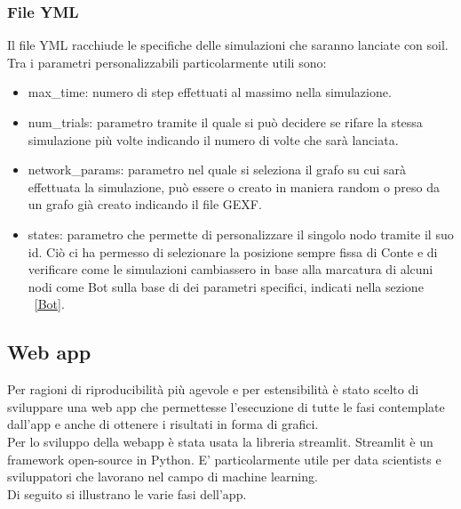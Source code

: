         \subsubsection{File YML}
        Il file YML racchiude le specifiche delle simulazioni che saranno lanciate con soil.\\
        Tra i parametri personalizzabili particolarmente utili sono:
        \begin{itemize}
          \item max\_time: numero di step effettuati al massimo nella simulazione.
          \item num\_trials: parametro tramite il quale si può decidere se rifare la stessa simulazione più volte indicando il numero di volte che sarà lanciata.
          \item network\_params: parametro nel quale si seleziona il grafo su cui sarà effettuata la simulazione, può essere o creato in maniera random o preso da un grafo già creato indicando il file GEXF.
          \item states: parametro che permette di personalizzare il singolo nodo tramite il suo id. Ciò ci ha permesso di selezionare la posizione sempre fissa di Conte e di verificare come le simulazioni cambiassero in base alla marcatura di alcuni nodi come Bot sulla base di dei parametri specifici, indicati nella sezione ~\ref{Bot}.
        \end{itemize}

    \subsection{Web app}
      Per ragioni di riproducibilità più agevole e per estensibilità è stato scelto di sviluppare una web app che permettesse l’esecuzione di tutte le fasi contemplate dall’app e anche di ottenere i risultati in forma di grafici.\\
      Per lo sviluppo della webapp è stata usata la libreria streamlit. Streamlit è un framework open-source in Python. E’ particolarmente utile per data scientists e sviluppatori che lavorano nel campo di machine learning.\\

      Di seguito si illustrano le varie fasi dell’app.
